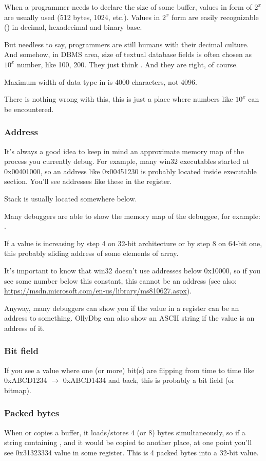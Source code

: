 When a programmer needs to declare the size of some buffer, values in form of $2^x$ are usually used (512 bytes, 1024, etc.).
Values in $2^x$ form are easily recognizable () in decimal, hexadecimal and binary base.

But needless to say, programmers are still humans with their decimal culture.
And somehow, in \ac{DBMS} area, size of textual database fields is often chosen as $10^x$ number, like 100, 200.
They just think .
And they are right, of course.

Maximum width of  data type in \oracle is 4000 characters, not 4096.

There is nothing wrong with this, this is just a place where numbers like $10^x$ can be encountered.

\subsubsection{Address}

It's always a good idea to keep in mind an approximate memory map of the process you currently debug.
For example, many win32 executables started at 0x00401000, so an address like 0x00451230 is probably located inside
executable section. You'll see addresses like these in the  register.

Stack is usually located somewhere below. %

Many debuggers are able to show the memory map of the debuggee, for example: .

If a value is increasing by step 4 on 32-bit architecture or by step 8 on 64-bit one,
this probably sliding address of some elements of array.

It's important to know that win32 doesn't use addresses below 0x10000, so if you see some number below this constant,
this cannot be an address (see also: \url{https://msdn.microsoft.com/en-us/library/ms810627.aspx}).

Anyway, many debuggers can show you if the value in a register can be an address to something.
OllyDbg can also show an ASCII string if the value is an address of it.

\subsubsection{Bit field}

If you see a value where one (or more) bit(s) are flipping from time to time like 0xABCD1234 $\rightarrow$ 0xABCD1434 and back,
this is probably a bit field (or bitmap).

\subsubsection{Packed bytes}

When  or  copies a buffer, it loads/stores 4 (or 8) bytes simultaneously,
so if a string containing , and it would be copied to another place,
at one point you'll see 0x31323334 value in some register.
This is 4 packed bytes into a 32-bit value.

